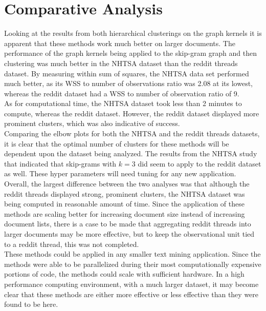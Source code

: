 \section{Comparative Analysis}

\hspace*{0.5cm} Looking at the results from both hierarchical clusterings on the graph kernels it is apparent that these methods work much better on larger documents. The performance of the graph kernels being applied to the skip-gram graph and then clustering was much better in the NHTSA dataset than the reddit threads dataset. By measuring within sum of squares, the NHTSA data set performed much better, as its WSS to number of observations ratio was 2.08 at its lowest, whereas the reddit dataset had a WSS to number of observation ratio of 9.\\
 
As for computational time, the NHTSA dataset took less than 2 minutes to compute, whereas the reddit dataset. However, the reddit dataset displayed more prominent clusters, which was also indicative of success.\\

Comparing the elbow plots for both the NHTSA and the reddit threads datasets, it is clear that the optimal number of clusters for these methods will be dependent upon the dataset being analyzed. The results from the NHTSA study that indicated that skip-grams with $k=3$ did seem to apply to the reddit dataset as well. These hyper parameters will need tuning for any new application.\\

Overall, the largest difference between the two analyses was that although the reddit threads displayed strong, prominent clusters, the NHTSA dataset was being computed in reasonable amount of time. Since the application of these methods are scaling better for increasing document size instead of increasing document lists, there is a case to be made that aggregating reddit threads into larger documents may be more effective, but to keep the observational unit tied to a reddit thread, this was not completed.\\ 

These methods could be applied in any smaller text mining application. Since the methods were able to be parallelized during their most computationally expensive portions of code, the methods could scale with sufficient hardware. In a high performance computing environment, with a much larger dataset, it may become clear that these methods are either more effective or less effective than they were found to be here.

